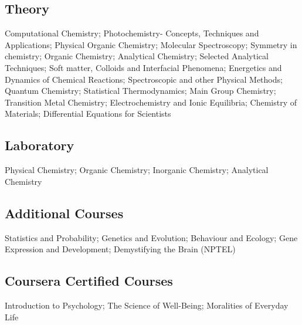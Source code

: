 \subsection{\textbf{Theory}}
 
   
    {%
Computational Chemistry;
Photochemistry- Concepts, Techniques and Applications;
Physical Organic Chemistry;
Molecular Spectroscopy;
Symmetry in chemistry;
Organic Chemistry;
Analytical Chemistry;
Selected Analytical Techniques;
Soft matter, Colloids and Interfacial Phenomena;
Energetics and Dynamics of Chemical Reactions;
Spectroscopic and other Physical Methods;
Quantum Chemistry;
Statistical Thermodynamics;
Main Group Chemistry;
Transition Metal Chemistry;
Electrochemistry and Ionic Equilibria;
Chemistry of Materials;
Differential Equations for Scientists   }


\vspace{-3mm}
\subsection{\textbf{Laboratory}}
   

    {%
Physical Chemistry;
Organic Chemistry;
Inorganic Chemistry;
Analytical Chemistry }

\vspace{-3mm}
\subsection{\textbf{Additional Courses}}

{%
Statistics and Probability;
Genetics and Evolution;
Behaviour and Ecology;
Gene Expression and Development;
Demystifying the Brain (NPTEL)
}

\vspace{-3mm}
\subsection{\textbf{Coursera Certified Courses}}

{%
Introduction to Psychology;
The Science of Well-Being;
Moralities of Everyday Life
}
